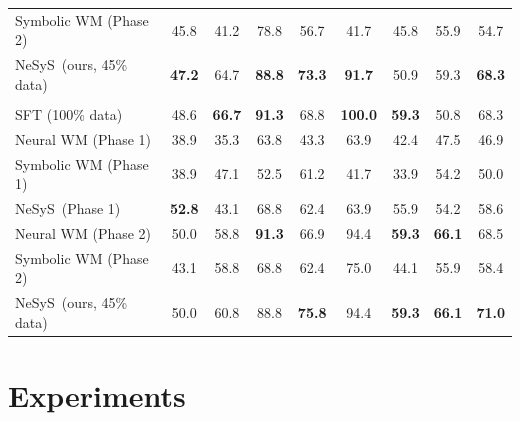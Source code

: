 \documentclass{article}
\theoremstyle{plain}
\theoremstyle{definition}
\theoremstyle{remark}
\newcommand{\ours}{{\sc NeSyS}\xspace}
\begin{document}
\begin{table}[ht]
\begin{tabular}{lcccccccc}
    Symbolic WM (Phase 2) & 45.8 & 41.2 & 78.8 & 56.7 & 41.7 & 45.8 & 55.9 & 54.7\\
    \ours~(ours, 45\% data\footnotemark) & \textbf{47.2} & 64.7 & \textbf{88.8} & \textbf{73.3} & \textbf{91.7} & 50.9 & 59.3 & \textbf{68.3}\\
    \midrule
    \rowcolor{gray!15}
    \multicolumn{9}{c}{\bf Qwen3-4B} \\
    \midrule
    SFT (100\% data) & 48.6 & \textbf{66.7} & \textbf{91.3} & 68.8 & \textbf{100.0} & \textbf{59.3} & 50.8 & 68.3 \\
    \midrule
    Neural WM (Phase 1) & 38.9 & 35.3 & 63.8 & 43.3 & 63.9 & 42.4 & 47.5 & 46.9 \\
    Symbolic WM (Phase 1) & 38.9 & 47.1 & 52.5 & 61.2 & 41.7 & 33.9 & 54.2 & 50.0 \\
    \ours\ (Phase 1) 
    & \textbf{52.8} & 43.1 & 68.8 & 62.4 & 63.9 & 55.9 & 54.2 & 58.6\\
    \midrule
    Neural WM (Phase 2) & 50.0 & 58.8 & \textbf{91.3} & 66.9 & 94.4 & \textbf{59.3} & \textbf{66.1} & 68.5\\
    Symbolic WM (Phase 2) & 43.1 & 58.8 & 68.8 & 62.4 & 75.0 & 44.1 & 55.9 & 58.4 \\
    \ours~(ours, 45\% data) & 50.0 & 60.8 & 88.8 & \textbf{75.8} & 94.4 & \textbf{59.3} & \textbf{66.1} & \textbf{71.0}\\
    \bottomrule
  \end{tabular}
\end{table}
\section{Experiments} \label{sec:exp}
\end{document}
